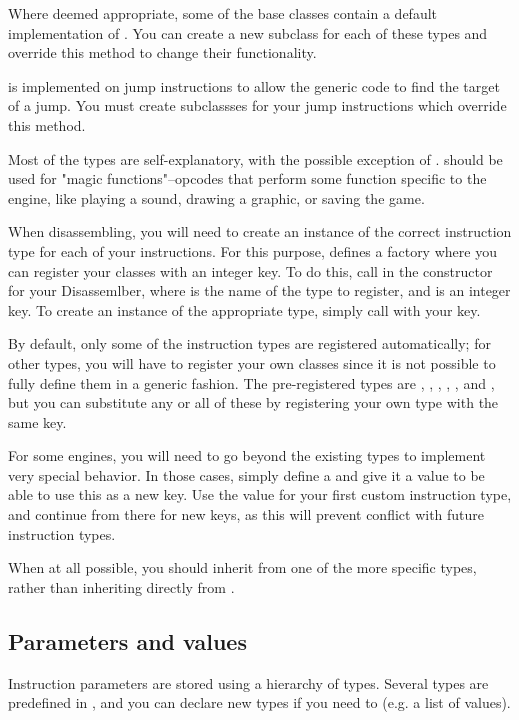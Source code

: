 Where deemed appropriate, some of the base classes contain a default implementation of . You can create a new subclass for each of these types and override this method to change their functionality.

 is implemented on jump instructions to allow the generic code to find the target of a jump. You must create subclassses for your jump instructions which override this method.

Most of the types are self-explanatory, with the possible exception of .  should be used for "magic functions"--opcodes that perform some function specific to the engine, like playing a sound, drawing a graphic, or saving the game.

When disassembling, you will need to create an instance of the correct instruction type for each of your instructions. For this purpose,  defines a factory  where you can register your classes with an integer key. To do this, call  in the constructor for your Disassemlber, where  is the name of the type to register, and  is an integer key. To create an instance of the appropriate type, simply call  with your key.

By default, only some of the instruction types are registered automatically; for other types, you will have to register your own classes since it is not possible to fully define them in a generic fashion. The pre-registered types are , , , , ,  and , but you can substitute any or all of these by registering your own type with the same key.

For some engines, you will need to go beyond the existing types to implement very special behavior. In those cases, simply define a  and give it a value to be able to use this as a new key. Use the value  for your first custom instruction type, and continue from there for new keys, as this will prevent conflict with future instruction types.

When at all possible, you should inherit from one of the more specific types, rather than inheriting directly from .

\subsection{Parameters and values}
\label{sec:parameter}
Instruction parameters are stored using a hierarchy of  types. Several types are predefined in , and you can declare new types if you need to (e.g. a list of values).

